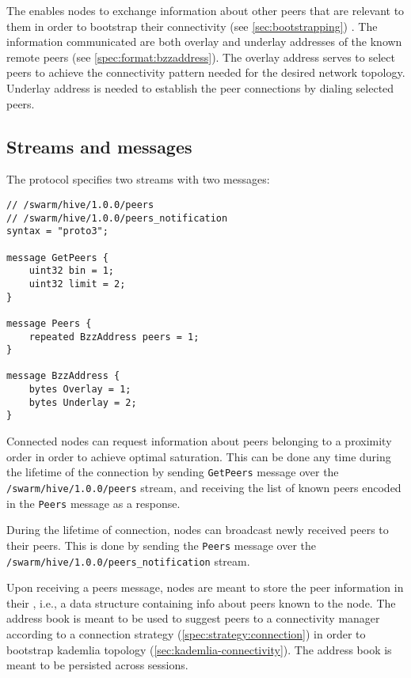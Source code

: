 The  enables nodes to exchange information about other peers that are relevant to them in order to bootstrap their connectivity  (see \ref{sec:bootstrapping}) . The information communicated are both overlay and underlay addresses of the known remote peers (see  \ref{spec:format:bzzaddress}). The overlay address serves to select peers to achieve the connectivity pattern needed for the desired network topology. Underlay address is needed to establish the peer connections by dialing selected peers.

\subsection{Streams and messages \statusgreen}

The protocol specifies two streams with two messages:

\begin{definition}\label{def:hive-messages}

\begin{lstlisting}
// /swarm/hive/1.0.0/peers
// /swarm/hive/1.0.0/peers_notification
syntax = "proto3";

message GetPeers {
    uint32 bin = 1;       
    uint32 limit = 2;
}

message Peers {
    repeated BzzAddress peers = 1;
}

message BzzAddress {
    bytes Overlay = 1;
    bytes Underlay = 2;
}
\end{lstlisting}
\end{definition}

Connected nodes can request information about peers belonging to a proximity order in order to achieve optimal saturation. This can be done any time during the lifetime of the connection by sending \lstinline{GetPeers} message over the \lstinline{/swarm/hive/1.0.0/peers} stream, and receiving the list of known peers encoded in the \lstinline{Peers} message as a response.

During the lifetime of connection, nodes can broadcast newly received peers to their peers. This is done by sending the \lstinline{Peers} message over the \\\lstinline{/swarm/hive/1.0.0/peers_notification} stream.


Upon receiving a peers message, nodes are meant to store the peer information in their , i.e., a data structure containing info about peers known to the node. The address book is meant to be used to suggest peers  to a connectivity manager according to a connection strategy (\ref{spec:strategy:connection}) in order to bootstrap kademlia topology (\ref{sec:kademlia-connectivity}). The address book is meant to be persisted across sessions.

